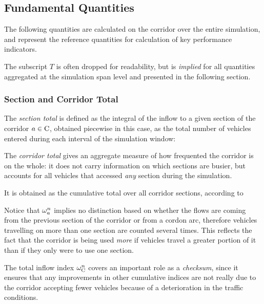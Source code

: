 \subsection{Fundamental Quantities}
The following quantities are calculated on the corridor over the entire simulation, and represent the reference quantities for calculation of key performance indicators.

The subscript $T$ is often dropped for readability, but is \emph{implied} for all quantities aggregated at the simulation span level and presented in the following section. 

\subsubsection*{Section and Corridor Total}
The \emph{section total} is defined as the integral of the inflow to a given section of the corridor $a \in \mathrm{C}$, obtained piecewise in this case, as the total number of vehicles entered during each interval of the simulation window:

The \emph{corridor total} gives an aggregate measure of how frequented the corridor is on the whole: it does not carry information on which sections are busier, but accounts for all vehicles that accessed \emph{any} section during the simulation.

It is obtained as the cumulative total over all corridor sections, according to

Notice that $\omega_{a}^{n}$ implies no distinction based on whether the flows are coming from the previous section of the corridor or from a cordon arc, therefore vehicles travelling on more than one section are counted several times. 
This reflects the fact that the corridor is being used \emph{more} if vehicles travel a greater portion of it than if they only were to use one section.

The total inflow index $\omega_{\mathrm{C}}^{n}$ covers an important role as a \emph{checksum}, since it ensures that any improvements in other cumulative indices are not really due to the corridor accepting fewer vehicles because of a deterioration in the traffic conditions.

